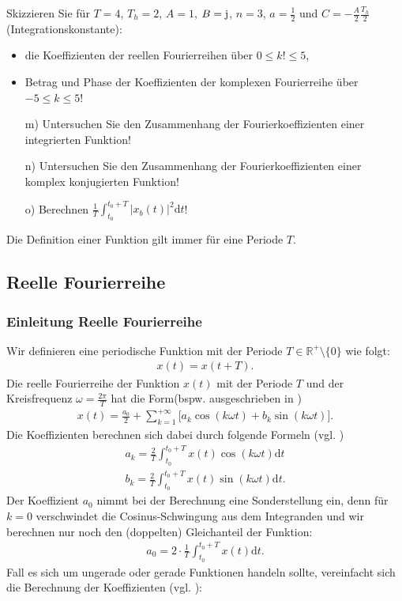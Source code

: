 \documentclass[11pt,a4paper,DIV=12]{scrartcl}
\newcommand{\diff}{\mathrm{d}}
\begin{document}
Skizzieren Sie für $T=4$, $T_h=2$, $A=1$, $B=\im$, $n= 3$, $a=\frac{1}{2}$ und $C=-\frac{A}{2}\frac{T_h}{2}$ (Integrationskonstante):
\begin{itemize}
	\item die Koeffizienten der reellen Fourierreihen über $0\leq k! \leq 5$,
	\item Betrag und Phase der Koeffizienten der komplexen Fourierreihe über $-5\leq k \leq 5$!
\end{itemize}
\begin{itemize}
	\item[m) ] Untersuchen Sie den Zusammenhang der Fourierkoeffizienten einer integrierten Funktion!
	\item[n) ] Untersuchen Sie den Zusammenhang der Fourierkoeffizienten einer komplex konjugierten Funktion!
	\item[o) ] Berechnen $\frac{1}{T}\int_{t_0}^{t_0+T}|x_b(t)|^2\diff t$!
\end{itemize}
Die Definition einer Funktion gilt immer für eine Periode $T$.
\newpage
\subsection*{Reelle Fourierreihe}
\subsubsection*{Einleitung Reelle Fourierreihe}
Wir definieren eine periodische Funktion mit der Periode $T\in\mathbb{R}^+\setminus\{0\}$ wie folgt:
\begin{align}
	x(t)=x(t+T).
\end{align}
Die reelle Fourierreihe der Funktion $x(t)$ mit der Periode $T$ und der Kreisfrequenz $\omega=\frac{2\pi}{T}$ hat die Form(bspw. ausgeschrieben in \cite[Kap. 7, S. 474]{Bronstein2015})
\begin{align}
	\label{eq:RealFourierSeries}
	x(t)=\frac{a_0}{2}+\sum_{k=1}^{+\infty}\Bigg [ a_k\cos(k\omega t)+b_k\sin(k\omega t)\Bigg ].
\end{align}
Die Koeffizienten berechnen sich dabei durch folgende Formeln (vgl. \cite[Kap. 7, S. 474]{Bronstein2015})
\begin{gather}
	\label{eq:Koeff}
	a_k=\frac{2}{T}\int_{t_0}^{t_0+T}x(t)\cos(k\omega t)\diff t \\
	b_k=\frac{2}{T}\int_{t_0}^{t_0+T}x(t)\sin(k\omega t)\diff t.
\end{gather}
Der Koeffizient $a_0$ nimmt bei der Berechnung eine Sonderstellung ein, denn für $k=0$ verschwindet die Cosinus-Schwingung aus dem Integranden und wir berechnen nur noch den (doppelten) Gleichanteil der Funktion:
\begin{align}
	\label{eq:A0}
	a_0=2\cdot\frac{1}{T}\int_{t_0}^{t_0+T}x(t)\diff t.
\end{align}
Fall es sich um ungerade oder gerade Funktionen handeln sollte, vereinfacht sich die Berechnung der Koeffizienten (vgl. \cite[Kap.7, S. 476]{Bronstein2015}):
\end{document}
